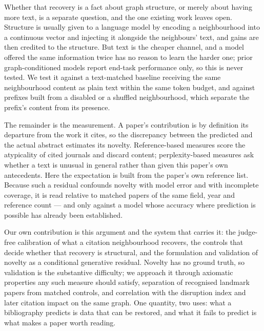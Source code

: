 \documentclass[12pt]{article}
\begin{document}
Whether that recovery is a fact about graph structure, or merely
about having more text, is a separate question, and the one existing
work leaves open. Structure is usually given to a language model by
encoding a neighbourhood into a continuous vector and injecting it
alongside the neighbours' text, and gains are then credited to the
structure. But text is the cheaper channel, and a model offered the
same information twice has no reason to learn the harder one; prior
graph-conditioned models report end-task performance only, so this is
never tested. We test it against a text-matched baseline receiving
the same neighbourhood content as plain text within the same token
budget, and against prefixes built from a disabled or a shuffled
neighbourhood, which separate the prefix's content from its presence.

The remainder is the measurement. A paper's contribution is by
definition its departure from the work it cites, so the discrepancy
between the predicted and the actual abstract estimates its novelty.
Reference-based measures score the atypicality of cited journals and
discard content; perplexity-based measures ask whether a text is
unusual in general rather than given this paper's own antecedents.
Here the expectation is built from the paper's own reference list.
Because such a residual confounds novelty with model error and with
incomplete coverage, it is read relative to matched papers of the
same field, year and reference count — and only against a model whose
accuracy where prediction is possible has already been established.

Our own contribution is this argument and the system that carries it:
the judge-free calibration of what a citation neighbourhood recovers,
the controls that decide whether that recovery is structural, and the
formulation and validation of novelty as a conditional generative
residual. Novelty has no ground truth, so validation is the
substantive difficulty; we approach it through axiomatic properties
any such measure should satisfy, separation of recognised landmark
papers from matched controls, and correlation with the disruption
index and later citation impact on the same graph. One quantity, two
uses: what a bibliography predicts is data that can be restored, and
what it fails to predict is what makes a paper worth reading.
\end{document}
